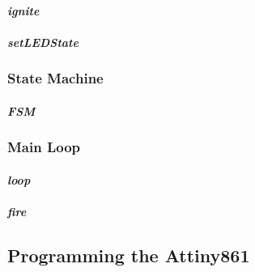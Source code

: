 \paragraph{\textit{ignite}}
\paragraph{\textit{setLEDState}}
\pagebreak

\subsubsection{State Machine}
\label{State Machine}
\paragraph{\textit{FSM}}
\pagebreak

\subsubsection{Main Loop}
\paragraph{\textit{loop}}
\paragraph{\textit{fire}}
\pagebreak

\subsection{Programming the Attiny861}
\label{Programming the Attiny861}


\pagebreak








